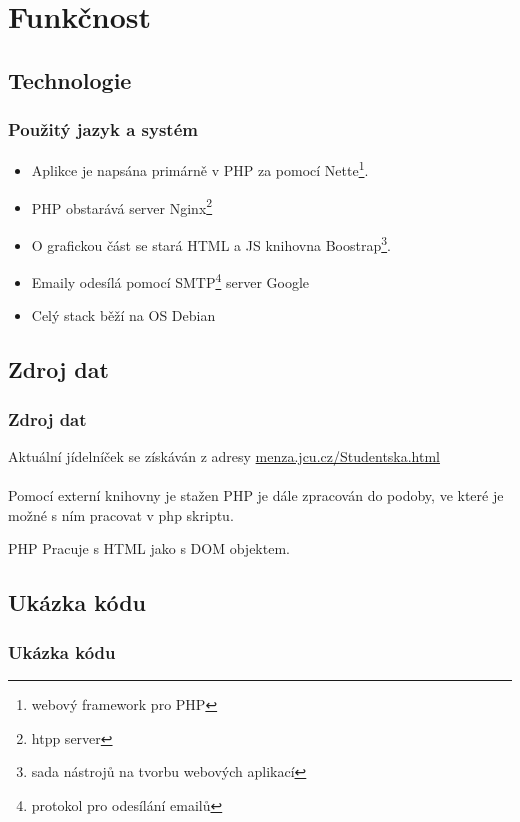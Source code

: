 \documentclass[slidestop]{beamer}
\begin{document}
\section{Funkčnost}
\subsection{Technologie}
\begin{frame}
\frametitle{Použitý jazyk a systém}
\vfill
\begin{itemize}

\item Aplikce je napsána primárně v PHP za pomocí Nette\footnote{webový framework pro PHP}.

\item PHP obstarává server Nginx\footnote{htpp server}

\item O grafickou část se stará HTML a JS knihovna Boostrap\footnote{sada nástrojů na tvorbu webových aplikací}.

\item Emaily odesílá pomocí SMTP\footnote{protokol pro odesílání emailů} server Google

\item Celý stack běží na OS Debian

\end{itemize}
\vfill
\end{frame}
\subsection{Zdroj dat}
\begin{frame}
\frametitle{Zdroj dat}
\vfill
Aktuální jídelníček se získáván z adresy \href{http://menza.jcu.cz/Studentska.html}{menza.jcu.cz/Studentska.html}
\\~\\
Pomocí externí knihovny je stažen  PHP je dále zpracován do podoby, ve které je možné s ním pracovat v php skriptu.

\begin{alertblock}{PHP}
Pracuje s HTML jako s DOM objektem.
\end{alertblock}
\vfill
\end{frame}
\subsection{Ukázka kódu}
\begin{frame}[containsverbatim]
\frametitle{Ukázka kódu}
\begin{figure}[h] %
\begin{center}
\end{center}
\end{figure}
\end{frame}
\end{document}
